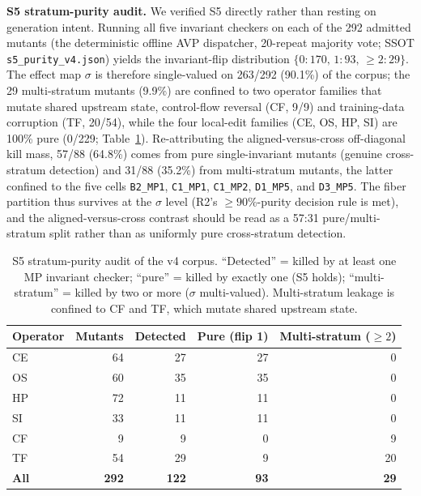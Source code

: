 \documentclass[manuscript,screen,review]{acmart}
\begin{document}
\label{s5-audit}
\textbf{S5 stratum-purity audit.} We verified S5 directly rather than
resting on generation intent. Running all five invariant checkers on
each of the 292 admitted mutants (the deterministic offline AVP
dispatcher, 20-repeat majority vote; SSOT \texttt{s5\_purity\_v4.json})
yields the invariant-flip distribution $\{0{:}170,\,1{:}93,\,\ge 2{:}29\}$.
The effect map $\sigma$ is therefore single-valued on 263/292 (90.1\%) of
the corpus; the 29 multi-stratum mutants (9.9\%) are confined to two
operator families that mutate shared upstream state, control-flow
reversal (CF, 9/9) and training-data corruption (TF, 20/54), while the
four local-edit families (CE, OS, HP, SI) are 100\% pure (0/229;
Table~\ref{tab:s5-purity}). Re-attributing the aligned-versus-cross
off-diagonal kill mass, 57/88 (64.8\%) comes from pure single-invariant
mutants (genuine cross-stratum detection) and 31/88 (35.2\%) from
multi-stratum mutants, the latter confined to the five cells
\texttt{B2\_MP1}, \texttt{C1\_MP1}, \texttt{C1\_MP2}, \texttt{D1\_MP5},
and \texttt{D3\_MP5}. The fiber partition thus survives at the $\sigma$
level (R2's $\ge 90\%$-purity decision rule is met), and the
aligned-versus-cross contrast should be read as a 57:31 pure/multi-stratum
split rather than as uniformly pure cross-stratum detection.

{%
\begin{longtable}[]{@{}lrrrr@{}}
\caption{S5 stratum-purity audit of the v4 corpus. ``Detected'' = killed
by at least one MP invariant checker; ``pure'' = killed by exactly one
(S5 holds); ``multi-stratum'' = killed by two or more ($\sigma$
multi-valued). Multi-stratum leakage is confined to CF and TF, which
mutate shared upstream state.}\label{tab:s5-purity}\\
\toprule\noalign{}
Operator & Mutants & Detected & Pure (flip 1) & Multi-stratum ($\ge 2$) \\
\midrule\noalign{}
\endfirsthead
\endhead
\bottomrule\noalign{}
\endlastfoot
CE & 64 & 27 & 27 & 0 \\
OS & 60 & 35 & 35 & 0 \\
HP & 72 & 11 & 11 & 0 \\
SI & 33 & 11 & 11 & 0 \\
CF & 9 & 9 & 0 & 9 \\
TF & 54 & 29 & 9 & 20 \\
\textbf{All} & \textbf{292} & \textbf{122} & \textbf{93} & \textbf{29} \\
\end{longtable}
}
\end{document}
